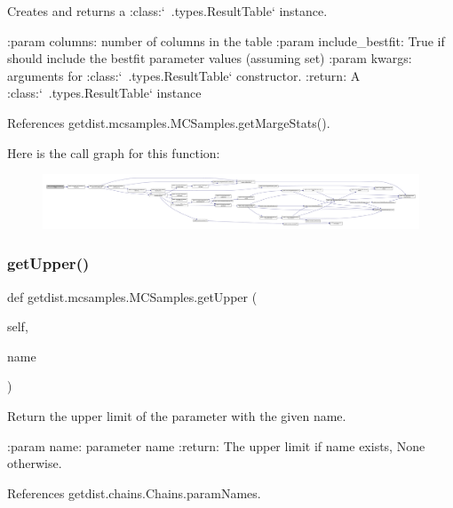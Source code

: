 \begin{DoxyVerb}Creates and returns a :class:`~.types.ResultTable` instance.

:param columns: number of columns in the table
:param include_bestfit: True if should include the bestfit parameter values (assuming set)
:param kwargs: arguments for :class:`~.types.ResultTable` constructor.
:return: A :class:`~.types.ResultTable` instance
\end{DoxyVerb}
 

References getdist.\+mcsamples.\+M\+C\+Samples.\+get\+Marge\+Stats().

Here is the call graph for this function\+:
\nopagebreak
\begin{figure}[H]
\begin{center}
\leavevmode
\includegraphics[width=350pt]{classgetdist_1_1mcsamples_1_1MCSamples_a2faa89318b77f8c9a09eec976272f54c_cgraph}
\end{center}
\end{figure}
\mbox{\label{classgetdist_1_1mcsamples_1_1MCSamples_aa631bee569cca53afa3ea837f66e2a5b}} 
\subsubsection{\texorpdfstring{get\+Upper()}{getUpper()}}
{\footnotesize\ttfamily def getdist.\+mcsamples.\+M\+C\+Samples.\+get\+Upper (\begin{DoxyParamCaption}\item[{}]{self,  }\item[{}]{name }\end{DoxyParamCaption})}

\begin{DoxyVerb}Return the upper limit of the parameter with the given name.

:param name: parameter name
:return: The upper limit if name exists, None otherwise.
\end{DoxyVerb}
 

References getdist.\+chains.\+Chains.\+param\+Names.



